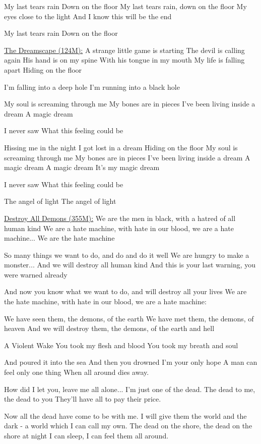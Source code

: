 \documentclass[11pt]{article}
\begin{document}
My last tears rain
Down on the floor
My last tears rain, down on the floor
My eyes close to the light
And I know this will be the end

My last tears rain
Down on the floor

\underline{The Dreamscape (124M):}
A strange little game is starting
The devil is calling again
His hand is on my spine
With his tongue in my mouth
My life is falling apart
Hiding on the floor

I'm falling into a deep hole
I'm running into a black hole

My soul is screaming through me
My bones are in pieces
I've been living inside a dream
A magic dream

I never saw
What this feeling could be

Hissing me in the night
I got lost in a dream
Hiding on the floor
My soul is screaming through me
My bones are in pieces
I've been living inside a dream
A magic dream
A magic dream
It's my magic dream

I never saw
What this feeling could be

The angel of light
The angel of light

\underline{Destroy All Demons (355M):}
We are the men in black, with a hatred of all human kind
We are a hate machine, with hate in our blood, we are a hate machine... We are the hate machine

So many things we want to do, and do and do it well
We are hungry to make a monster... And we will destroy all human kind
And this is your last warning, you were warned already

And now you know what we want to do, and will destroy all your lives
We are the hate machine, with hate in our blood, we are a hate machine:

We have seen them, the demons, of the earth
We have met them, the demons, of heaven
And we will destroy them, the demons, of the earth and hell

A Violent Wake
You took my flesh and blood
You took my breath and soul

And poured it into the sea
And then you drowned
I'm your only hope
A man can feel only one thing
When all around dies away.

How did I let you, leave me all alone...
I'm just one of the dead.
The dead to me, the dead to you
They'll have all to pay their price.

Now all the dead have come to be with me.
I will give them the world and the dark - a world which I can call my own.
The dead on the shore, the dead on the shore at night
I can sleep, I can feel them all around.
\end{document}
